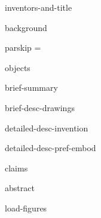 \documentclass[english]{patentex}
\begin{document}
{inventors-and-title}

\maketitle

{background}

parskip = \the\parskip

{objects}

{brief-summary}

{brief-desc-drawings}

{detailed-desc-invention}

{detailed-desc-pref-embod}

{claims}

{abstract}

{load-figures}
\end{document}
